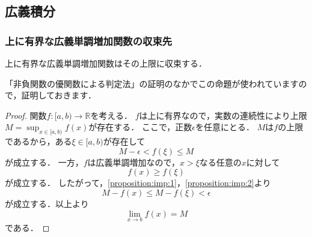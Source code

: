 \documentclass[./index]{subfiles}
\begin{document}
\subsection{広義積分}
\subsubsection{上に有界な広義単調増加関数の収束先}

\begin{screen}
    \begin{proposition}
        上に有界な広義単調増加関数はその上限に収束する．
    \end{proposition}
\end{screen}

「非負関数の優関数による判定法」の証明のなかでこの命題が使われていますので，証明しておきます．

\begin{proof}
    関数$f: [a, b) \rightarrow \mathbb{R}$を考える．
    $f$は上に有界なので，実数の連続性により上限$M = \sup_{x \in [a, b)} f(x)$が存在する．
    ここで，正数$\epsilon$を任意にとる．
    $M$は$f$の上限であるから，ある$\xi \in [a, b)$が存在して
    \begin{equation}
        \label{proposition:imp:1}
        M - \epsilon < f(\xi) \le M
    \end{equation}
    が成立する．
    一方，$f$は広義単調増加なので，$x > \xi$なる任意の$x$に対して
    \begin{equation}
        \label{proposition:imp:2}
        f(x) \ge f(\xi)
    \end{equation}
    が成立する．
    したがって，\cref{proposition:imp:1}，\cref{proposition:imp:2}より
    \begin{equation}
        M - f(x) \le M - f(\xi) < \epsilon
    \end{equation}
    が成立する．以上より
    \begin{equation}
        \lim_{x \rightarrow b} f(x) = M
    \end{equation}
    である．
\end{proof}
\end{document}
